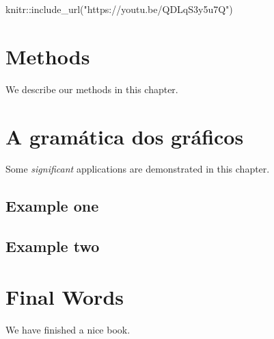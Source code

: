 \documentclass[
  brazilian,
]{book}
\newenvironment{Shaded}{\begin{snugshade}}{\end{snugshade}}
\newcommand{\FunctionTok}[1]{\textcolor[rgb]{0.00,0.00,0.00}{#1}}
\newcommand{\NormalTok}[1]{#1}
\newcommand{\SpecialCharTok}[1]{\textcolor[rgb]{0.00,0.00,0.00}{#1}}
\newcommand{\StringTok}[1]{\textcolor[rgb]{0.31,0.60,0.02}{#1}}
\begin{document}
\begin{Shaded}
\begin{Highlighting}[]
\NormalTok{knitr}\SpecialCharTok{::}\FunctionTok{include\_url}\NormalTok{(}\StringTok{"https://youtu.be/QDLqS3y5u7Q"}\NormalTok{)}
\end{Highlighting}
\end{Shaded}

\hypertarget{methods}{%
\chapter{Methods}\label{methods}}

We describe our methods in this chapter.

\hypertarget{a-gramuxe1tica-dos-gruxe1ficos}{%
\chapter{A gramática dos gráficos}\label{a-gramuxe1tica-dos-gruxe1ficos}}

Some \emph{significant} applications are demonstrated in this chapter.

\hypertarget{example-one}{%
\section{Example one}\label{example-one}}

\hypertarget{example-two}{%
\section{Example two}\label{example-two}}

\hypertarget{final-words}{%
\chapter{Final Words}\label{final-words}}

We have finished a nice book.

\renewcommand{\bibname}{Referências}

  
\end{document}
